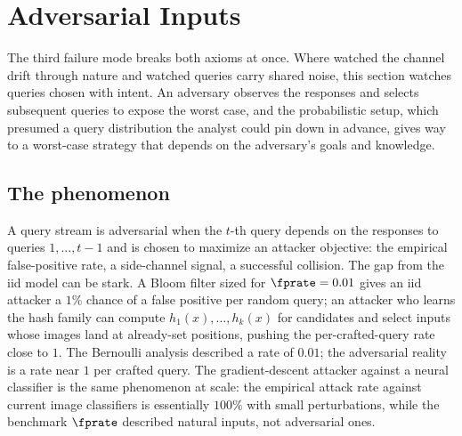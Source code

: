 %
%
%

\section{Adversarial Inputs}
\label{sec:adversarial-inputs}

The third failure mode breaks both axioms at once. Where
 watched the channel drift through nature and
 watched queries carry shared noise, this
section watches queries chosen with intent. An adversary observes the
responses and selects subsequent queries to expose the worst case, and
the probabilistic setup, which presumed a query distribution the analyst
could pin down in advance, gives way to a worst-case strategy that
depends on the adversary's goals and knowledge.

\subsection*{The phenomenon}

A query stream is adversarial when the $t$-th query depends on the
responses to queries $1, \ldots, t-1$ and is chosen to maximize an
attacker objective: the empirical false-positive rate, a side-channel
signal, a successful collision. The gap from the iid model can be stark.
A Bloom filter sized for $\fprate = 0.01$ gives an iid attacker a $1\%$
chance of a false positive per random query; an attacker who learns the
hash family can compute $h_1(x), \ldots, h_k(x)$ for candidates and select
inputs whose images land at already-set positions, pushing the
per-crafted-query rate close to $1$. The Bernoulli analysis described a
rate of $0.01$; the adversarial reality is a rate near $1$ per crafted
query. The gradient-descent attacker against a neural classifier is the
same phenomenon at scale: the empirical attack rate against current image
classifiers is essentially $100\%$ with small perturbations, while the
benchmark $\fprate$ described natural inputs, not adversarial ones.

